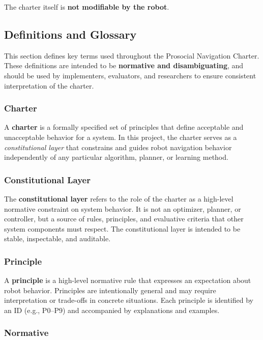 \documentclass[utf8]{frontiers_suppmat} %
\begin{document}
The charter itself is \textbf{not modifiable by the robot}.

\subsection{Definitions and Glossary}\label{definitions-and-glossary}

This section defines key terms used throughout the Prosocial Navigation
Charter. These definitions are intended to be \textbf{normative and
disambiguating}, and should be used by implementers, evaluators, and
researchers to ensure consistent interpretation of the charter.

\subsubsection{Charter}\label{charter}

A \textbf{charter} is a formally specified set of principles that define
acceptable and unacceptable behavior for a system. In this project, the
charter serves as a \emph{constitutional layer} that constrains and
guides robot navigation behavior independently of any particular
algorithm, planner, or learning method.

\subsubsection{Constitutional Layer}\label{constitutional-layer}

The \textbf{constitutional layer} refers to the role of the charter as a
high-level normative constraint on system behavior. It is not an
optimizer, planner, or controller, but a source of rules, principles,
and evaluative criteria that other system components must respect. The
constitutional layer is intended to be stable, inspectable, and
auditable.

\subsubsection{Principle}\label{principle}

A \textbf{principle} is a high-level normative rule that expresses an
expectation about robot behavior. Principles are intentionally general
and may require interpretation or trade-offs in concrete situations.
Each principle is identified by an ID (e.g., P0--P9) and accompanied by
explanations and examples.

\subsubsection{Normative}\label{normative}
\end{document}

